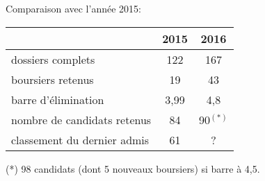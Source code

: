 \documentclass{beamer}
\begin{document}
\begin{frame}
Comparaison avec l'année 2015:

\begin{center}
  \begin{tabular}[h]{|l|c|c|}
    \hline
    &  2015 & 2016 \\ \hline\hline
    dossiers complets   & 122    & 167\\ \hline 
    boursiers retenus   & 19     & 43 \\ \hline
    barre d'élimination & 3,99 & 4,8 \\ \hline
    nombre de candidats retenus & 84  & 90$^{(*)}$  \\ \hline
    classement du dernier admis & 61  & ? \\ \hline
  \end{tabular}
\end{center}
\begin{small}
  (*) 98 candidats (dont 5 nouveaux boursiers) si barre à 4,5.
\end{small}
\end{frame}
\end{document}
